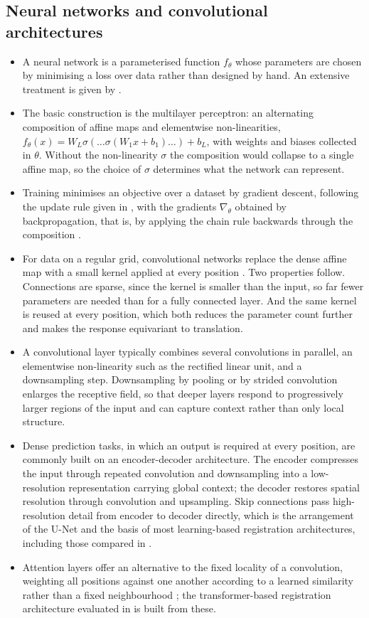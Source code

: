 \subsection{Neural networks and convolutional architectures}
\begin{itemize}
\item A neural network is a parameterised function $f_\theta$ whose parameters are chosen by minimising a loss over data rather than designed by hand. An extensive treatment is given by \citet{goodfellow2016deep}.
\item The basic construction is the multilayer perceptron: an alternating composition of affine maps and elementwise non-linearities, $f_\theta(x) = W_L \sigma(\dots \sigma(W_1 x + b_1) \dots) + b_L$, with weights and biases collected in $\theta$. Without the non-linearity $\sigma$ the composition would collapse to a single affine map, so the choice of $\sigma$ determines what the network can represent.
\item Training minimises an objective over a dataset by gradient descent, following the update rule given in , with the gradients $\nabla_\theta$ obtained by backpropagation, that is, by applying the chain rule backwards through the composition \citep{rumelhart1986learning}.
\item For data on a regular grid, convolutional networks replace the dense affine map with a small kernel applied at every position \citep{lecun1989backpropagation}. Two properties follow. Connections are sparse, since the kernel is smaller than the input, so far fewer parameters are needed than for a fully connected layer. And the same kernel is reused at every position, which both reduces the parameter count further and makes the response equivariant to translation.
\item A convolutional layer typically combines several convolutions in parallel, an elementwise non-linearity such as the rectified linear unit, and a downsampling step. Downsampling by pooling or by strided convolution enlarges the receptive field, so that deeper layers respond to progressively larger regions of the input and can capture context rather than only local structure.
\item Dense prediction tasks, in which an output is required at every position, are commonly built on an encoder-decoder architecture. The encoder compresses the input through repeated convolution and downsampling into a low-resolution representation carrying global context; the decoder restores spatial resolution through convolution and upsampling. Skip connections pass high-resolution detail from encoder to decoder directly, which is the arrangement of the U-Net \citep{ronneberger2015unet} and the basis of most learning-based registration architectures, including those compared in .
\item Attention layers offer an alternative to the fixed locality of a convolution, weighting all positions against one another according to a learned similarity rather than a fixed neighbourhood \citep{vaswani2017attention}; the transformer-based registration architecture evaluated in  is built from these.
\end{itemize}

